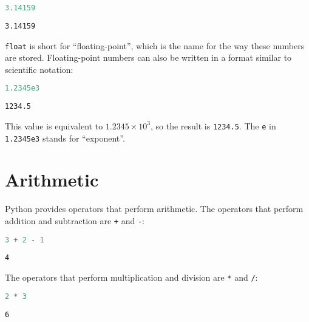\begin{lstlisting}[language=Python,style=source]
3.14159
\end{lstlisting}

\begin{lstlisting}[style=output]
3.14159
\end{lstlisting}

\passthrough{\lstinline!float!} is short for ``floating-point'', which
is the name for the way these numbers are stored. Floating-point numbers
can also be written in a format similar to scientific notation:

\begin{lstlisting}[language=Python,style=source]
1.2345e3
\end{lstlisting}

\begin{lstlisting}[style=output]
1234.5
\end{lstlisting}

This value is equivalent to \(1.2345 \times 10^{3}\), so the result is
\passthrough{\lstinline!1234.5!}. The \passthrough{\lstinline!e!} in
\passthrough{\lstinline!1.2345e3!} stands for ``exponent''.

\hypertarget{arithmetic}{%
\section{Arithmetic}\label{arithmetic}}

Python provides operators that perform arithmetic. The operators that
perform addition and subtraction are \passthrough{\lstinline!+!} and
\passthrough{\lstinline!-!}:

\begin{lstlisting}[language=Python,style=source]
3 + 2 - 1
\end{lstlisting}

\begin{lstlisting}[style=output]
4
\end{lstlisting}

The operators that perform multiplication and division are
\passthrough{\lstinline!*!} and \passthrough{\lstinline!/!}:

\begin{lstlisting}[language=Python,style=source]
2 * 3
\end{lstlisting}

\begin{lstlisting}[style=output]
6
\end{lstlisting}


